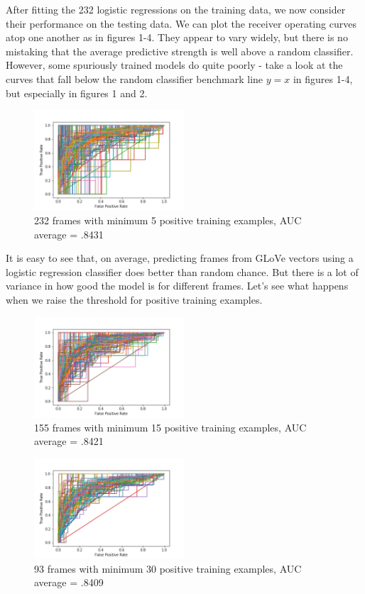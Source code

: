 \documentclass[a4paper]{article}
\begin{document}
After fitting the 232 logistic regressions on the training data, we now consider their performance on the testing data. We can plot the receiver operating curves atop one another as in figures 1-4. They appear to vary widely, but there is no mistaking that the average predictive strength is well above a random classifier. However, some spuriously trained models do quite poorly - take a look at the curves that fall below the random classifier benchmark line $y = x$ in figures 1-4, but especially in figures 1 and 2. 

\begin{figure}
\centering
\includegraphics[width=0.5\textwidth]{AUC_plot5.png}
\caption{\label{fig:frog} 232 frames with minimum 5 positive training examples, AUC average = .8431}
\end{figure}

It is easy to see that, on average, predicting frames from GLoVe vectors using a logistic regression classifier does better than random chance. But there is a lot of variance in how good the model is for different frames. Let's see what happens when we raise the threshold for positive training examples.

\begin{figure}
\centering
\includegraphics[width=0.5\textwidth]{auc_plot15.png}
\caption{\label{fig:frog} 155 frames with minimum 15 positive training examples, AUC average = .8421}
\end{figure}

\begin{figure}
\centering
\includegraphics[width=0.5\textwidth]{auc_plot30.png}
\caption{\label{fig:frog} 93 frames with minimum 30 positive training examples, AUC average = .8409}
\end{figure}
\end{document}
